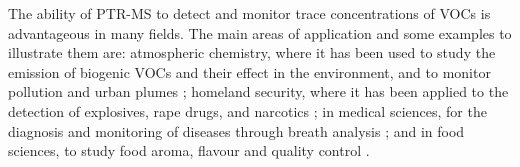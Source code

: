 The ability of PTR-MS to detect and monitor trace concentrations of VOCs is advantageous in many fields. The main areas of application and some examples to illustrate them are:
atmospheric chemistry, where it has been used to study the emission of biogenic VOCs and their effect in the environment, and to  monitor pollution and urban plumes \cite{doi:10.1029/2003JD003863,ROGERS200626};
%
homeland security, where it has been  applied to  the detection of explosives, rape drugs, and narcotics \cite{RN445,RN1254,doi:10.1021/acs.analchem.7b05211,doi:10.1002/jms.2993,Agarwal2011};
%
in medical sciences, for the diagnosis and monitoring of diseases through breath analysis \cite{FERNANDEZDELRIO20151243,doi:10.1152/jappl.2001.91.2.762,amann2014,malaskova2019proton};
%
and in food sciences, to study  food aroma, flavour and quality control \cite{doi:10.1021/jf020922g,doi:10.1021/jf803998c,doi:10.1002/jms.1797}.




















